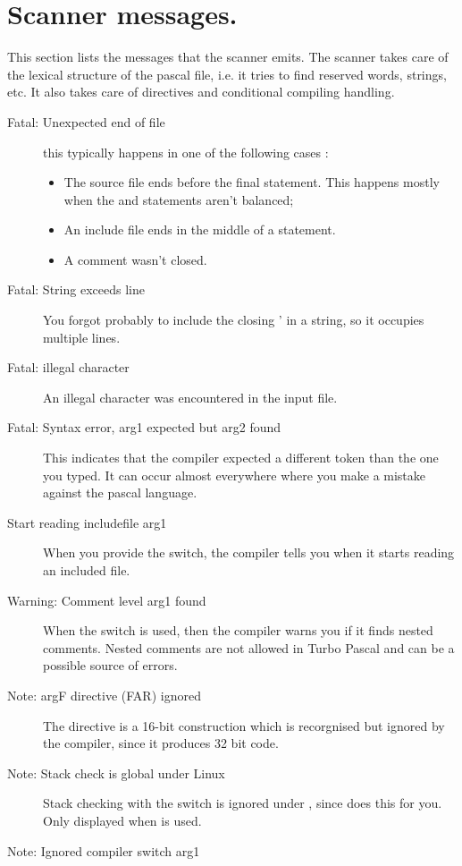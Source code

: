  \section{Scanner messages.}
 This section lists the messages that the scanner emits. The scanner takes
 care of the lexical structure of the pascal file, i.e. it tries to find
 reserved words, strings, etc. It also takes care of directives and
 conditional compiling handling.
 \begin{description}
\item [Fatal: Unexpected end of file]
 this typically happens in one of the following cases :
 \begin{itemize}
 \item The source file ends before the final  statement. This
 happens mostly when the  and  statements aren't
 balanced;
 \item An include file ends in the middle of a statement.
 \item A comment wasn't closed.
 \end{itemize}
\item [Fatal: String exceeds line]
 You forgot probably to include the closing ' in a string, so it occupies
 multiple lines.
\item [Fatal: illegal character]
 An illegal character was encountered in the input file.
\item [Fatal: Syntax error, arg1 expected but arg2 found]
 This indicates that the compiler expected a different token than
 the one you typed. It can occur almost everywhere where you make a
 mistake against the pascal language.
\item [Start reading includefile arg1]
 When you provide the  switch, the compiler tells you
 when it starts reading an included file.
\item [Warning: Comment level arg1 found]
 When the  switch is used, then the compiler warns you if
 it finds nested comments. Nested comments are not allowed in Turbo Pascal
 and can be a possible source of errors.
\item [Note: argF directive (FAR) ignored]
 The  directive is a 16-bit construction which is recorgnised
 but ignored by the compiler, since it produces 32 bit code.
\item [Note: Stack check is global under Linux]
 Stack checking with the  switch is ignored under \linux, since
 \linux does this for you. Only displayed when  is used.
\item [Note: Ignored compiler switch arg1]

\end{description}

